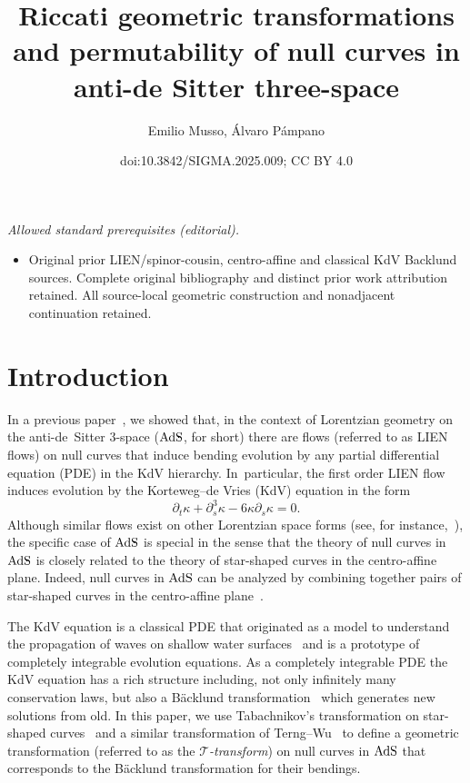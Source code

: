 \documentclass[10pt,a4paper]{amsart}
\title{Riccati geometric transformations and permutability of null curves in anti-de Sitter three-space}
\author{Emilio Musso, Álvaro Pámpano}
\date{doi:10.3842/SIGMA.2025.009; CC BY 4.0}
\numberwithin{equation}{section}
\def\bending{\kappa}
\def\AdS{{\rm AdS}}
\begin{document}
\maketitle
\noindent\textit{Allowed standard prerequisites (editorial).}\begin{itemize}
\item Original prior LIEN/spinor-cousin, centro-affine and classical KdV Backlund sources. Complete original bibliography and distinct prior work attribution retained. All source-local geometric construction and nonadjacent continuation retained.
\end{itemize}\medskip
\section{Introduction}

In a previous paper~\cite{MP}, we showed that, in the context of Lorentzian geometry on the anti-de~Sitter $3$-space ($\AdS$, for short) there are flows (referred to as LIEN flows) on null curves that induce bending evolution by any partial differential equation (PDE) in the KdV hierarchy. In~particular, the first order LIEN flow induces evolution by the Korteweg--de Vries (KdV) equation in the form
\begin{equation*}
\partial_t\bending+\partial_s^3\bending-6\bending \partial_s\bending=0.
\end{equation*}
Although similar flows exist on other Lorentzian space forms (see, for instance,~\cite{AGL,MN2}), the specific case of $\AdS$ is special in the sense that the theory of null curves in $\AdS$ is closely related to the theory of star-shaped curves in the centro-affine plane. Indeed, null curves in $\AdS$ can be analyzed by combining together pairs of star-shaped curves in the centro-affine plane~\cite{MP}.

The KdV equation is a classical PDE that originated as a model to understand the propagation of waves on shallow water surfaces~\cite{KV} and is a prototype of completely integrable evolution equations. As a completely integrable PDE the KdV equation has a rich structure including, not only infinitely many conservation laws, but also a B\"{a}cklund transformation~\cite{TU} which generates new solutions from old. In this paper, we use Tabachnikov's transformation on star-shaped curves~\cite{T} and a similar transformation of Terng--Wu~\cite{TW1} to define a geometric transformation (referred to as the \emph{$\mathcal{T}$-transform}) on null curves in $\AdS$ that corresponds to the B\"{a}cklund transformation for their bendings.
\end{document}
